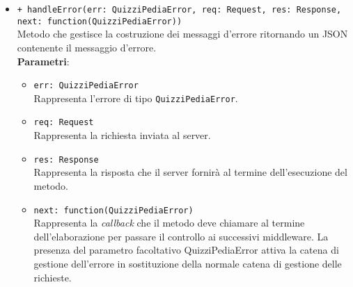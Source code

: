 \begin{itemize}
	\begin{itemize}
		\item \texttt{+ handleError(err: QuizziPediaError, req: Request, res: Response, next: function(QuizziPediaError))}\\
		Metodo che gestisce la costruzione dei messaggi d’errore ritornando un JSON contenente il messaggio d’errore.\\
		\textbf{Parametri}:
		\begin{itemize}
			\item \texttt{err: QuizziPediaError}\\
			Rappresenta l'errore di tipo \texttt{QuizziPediaError}.
			\item \texttt{req: Request}\\
			Rappresenta la richiesta inviata al server.
			\item \texttt{res: Response}\\
			Rappresenta la risposta che il server fornirà al termine dell'esecuzione del metodo.
			\item \texttt{next: function(QuizziPediaError)}\\
			Rappresenta la \textit{callback} che il metodo deve chiamare al termine dell’elaborazione per passare il controllo ai successivi middleware. La presenza del parametro facoltativo QuizziPediaError attiva la catena di gestione dell’errore in sostituzione della normale catena di gestione delle richieste.
		\end{itemize}
	\end{itemize}
\end{itemize}
